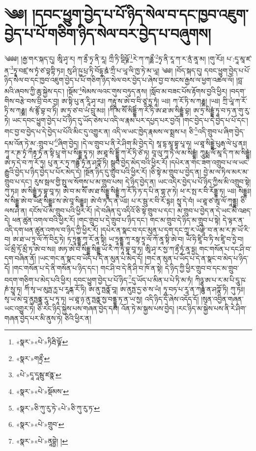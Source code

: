 \chapter{༄༅། །དབང་ཕྱུག་བྱེད་པ་པོ་ཉིད་སེལ་བ་དང་ཁྱབ་འཇུག་བྱེད་པ་པོ་གཅིག་ཉིད་སེལ་བར་བྱེད་པ་བཞུགས། }༄༅༅། །རྒྱ་གར་སྐད་དུ། ཨཱི་ཤྭ་ར། ཀ་རྷྲྀ་ཏྭ་ནི་རཱ། ཀྲྀ་ཏི་བྡིཥྞོ་\footnote{«སྣར་»«པེ་»ཏིརྦི་ཥྞོ་}རེ་ཀ་ཀརྷྲྶྀ་\footnote{«སྣར་»གརྟྲྀ་}ཏྭ་ནི་རཱ་ཀ་ར་ནྲཾ་ནཱ་མ། །གུ་རོཿ། པ་:དཱ་མཱ་ཛ་ན་\footnote{«པེ་»དཱ་དཱམྦུ་ཛནྣ་}ཏྭཱ་བཛྲ་ས་ཏྭཾ་ཙ་བྟཀྟི་ཏཿ། སུ་ཤི་ཥྱ་པྲ་ཏི་བོདྷཱ་རྛཾ་ཀྲྀ་པ་ཡཱ་ལི་ཁྱ་ཏེ་མ་ཡཱ། ༄༅། །བོད་སྐད་དུ། དབང་ཕྱུག་བྱེད་པ་པོ་ཉིད་སེལ་བ་དང་ཁྱབ་འཇུག་བྱེད་པ་པོ་གཅིག་ཉིད་སེལ་བར་བྱེད་པ་ཞེས་བྱ་བ་སངས་རྒྱས་ལ་ཕྱག་འཚལ་ལོ། །བླ་མའི་ཞབས་ཀྱི་ཆུ་སྐྱེས་དང་། །སྡོམ་\footnote{«སྣར་»«པེ་»སྡོམས་}སེམས་ལའང་གུས་བཏུད་ནས། །སློབ་མ་བཟང་པོས་རྟོགས་བྱའི་ཕྱིར། །བདག་གིས་བརྩེ་བས་བྲི་བར་བྱ། ཨ་སྟི་པུ་ན་རཱི་ཤྭ་རཿ། ཀརྟྱཱ་ས་ཨེ་བ་བི་ཙཱ་ཏྱ་ཏཱཾ། ཡཿ། ཀ་རོ་ཏི་ས་ཀརྞྞ། །ཡཿ། ཀྲི་ཡཱཾ་ཀ་རོ་ཏི་ས་ཀརྞྞ། སཾ་ཛྙོ་བྷ་བ་ཏི། ཨ་ཏྲ་ཙ་བ་ཡཾ་བྲུ་མཿ། །ཀི་མ་སཽ་སིདྡྷིཾ་ཀ་རོ་ཏི་ཨ་ཐ་ཨ་སིདྡྷཾ་བྷ། ཨ་ཏྲ་སིདྡྷཾ་ཏཱ་བ་ཏ་ན་གུ་རུ་ཏེ། ཡང་དབང་ཕྱུག་བྱེད་པ་པོ་ཉིད་དུ་ཡོད་ཅེས་པ་འདི་ལ་རྣམ་པར་དཔྱད་པར་བྱའོ། །གང་བྱེད་པ་དེ་བྱེད་པ་པོ་དང་། གང་བྱ་བ་བྱེད་པ་དེ་བྱེད་པ་པོའི་མིང་དུ་འགྱུར་ན། འདི་ལ་ཡང་ཁྱེད་རྣམས་ལ་སྨྲས་པ། ཅི་\footnote{«སྣར་»ཅི་ཀུ་རུ་ཏེ་«པེ་»ཅི་ཀུ་རུ་ཏ་}འདི་གྲུབ་པ་ཞིག་བྱེད་དམ་འོན་ཏེ་མ་:གྲུབ་པ་\footnote{«སྣར་»«པེ་»གྲུབ་}ཞིག་བྱེད། །དེ་ལ་གྲུབ་པ་ནི་རེ་ཤིག་མི་བྱེད་དེ། སཱ་དྷ་མཱ་བྷཱ་པཱ་ཧ། ཡ་ཐཱ་སིདྡྷེ་པུརྒ་ལེ་པུ་ནཿ། ཀཱ་ར་ཎ་ཏྭཾ་ཀྀརྟྭ་ཏྭཾ་ན་སྟི་པྲཱ་གེ་པ་སིདྡྷ་ཏྭཱ་ཏ། ཨ་ཐཱ་སི་དྡྷཱིཾ་ཀ་རོ་ཏི་ཙེ་ཏ། བཱ་ལུ་ཀཱ་ཏཻ་ལ་མ་སིདྡྷཾ། ཀཱུརྨྨ་ལོ་མཱ་དི་ཀ་མ་སིདྡྷཾ། ཨེ་ཏ་དེ་བ་ཀ་རོ་ཏུ། པུ་ན་ར་ཏྲ་ཀརྟྟྲྀ་ཏྭཾ་ན་ཤཀྣོ་ཏི། སྒྲུབ་བྱེད་མེད་བའི་ཕྱིར་རོ། །དཔེར་ན་གང་ཟག་འགྲུབ་པ་ལ་ཡང་རྒྱུའི་བྱེད་པ་ཉིད་བྱེད་པ་པོར་མེད་དེ། །སྔོན་ཉིད་དུ་གྲུབ་པའི་ཕྱིར་རོ། །ཅི་སྟེ་མ་གྲུབ་པ་བྱེད་ན། བྱེ་མ་ལ་ཏིལ་མར་མ་གྲུབ་པ་དང་། རུས་སྦལ་གྱི་སྤུ་ལ་སོགས་པ་མ་གྲུབ་པས། དེ་ཉིད་བྱེད་ན། ཡང་འདིར་བྱེད་པ་པོ་ཉིད་ཀྱིས་མི་འགྲུབ་སྟེ། ཀུ་ཏཿ། ཨ་སིདྡྷཾ་ཏྭ་བྷཱ་བཱ་ཏ། ཨེ་བ་མ་སཽ་ཨ་ཐ་སིདྡྷཱ་སིདྡྷཾ་ཀ་རོ་ཏི་ཏ་ད་པི་ན་གྷ་ཊ་ཏེ། ཕ་ར་སྤ་ར་བི་རོཏྡྷ་ཏ། ཡཿ། སིདྡྷཿ། ས་སིདྡྷ་ཨེ་བ་ཡོརྡ་སིདྡྷཿ་ས་ཨེ་བཱ་སིདྡྷཿ། ཨེ་བཾ་ཏ་ད་ན་ཡོཿ། པ་ར་སྦུ་ར་བི་རོ་དྷཿ། སྱཱ་དེ་བཾ། ཡ་ཐཱ་ཙ་ཨཱ་ལོ་ཀཱནྡྷ། ཅི་ལས་ཤེ་ན། དངོས་པོ་མ་གྲུབ་པའི་ཕྱིར་རོ། །དེ་བཞིན་དུ་འདིའོ་ཅི་སྟེ་གྲུབ་པ་དང་། མ་གྲུབ་པ་བྱེད་ན་དེ་ཡང་མི་འཐད་དེ། ཕན་ཚུན་འགལ་བའི་ཕྱིར་རོ། །གང་གྲུབ་པ་དེ་གྲུབ་པ་ཉིད་དང་། གང་མ་གྲུབ་དེ་ཉིད་མ་གྲུབ་པ་སྟེ། དེ་ལྟར་ན་འདི་དག་ཕན་ཚུན་འགལ་བ་ཉིད་ཀྱི་ཕྱིར་རོ། །དཔེར་ན་སྣང་བ་དང་མུན་པ་དག་དང་ཀྲཱ་ར་ཡོརྫཱི་བ་ན་མ་ར་ཎ་ཡོ་རི་བ། ཨ་ཐ་ཡ་ཏྲཱ་ལོ་ཀོ་བིརྱ་ཏེ། ཏ་ཏྲཱནྡྷ་ཀཱ་རོ་ནཱ་སྟི། ཡ་ཏྲཱནྡྷ་ཀཱ་རསྟ་ཏྲཱ་ལོ་ཀོ་ནཱ་སྟི་ཨེ་བ། ཡོ་ཧི་ཛཱི་བ་ཏི་ས་ཛཱི་བ་ཏྱེ་བ། ཡོ་མྲྀ་ཏོ་མྲྀ་ཏ་ཨེ་བ་སཿ། ཨཏ་ཨེ་བ་སིདྡྷ་སིདྡྷ་ཡོ་རཻ་ཀ་ཏཱ་བྷཱ་བཱ་ཏ། ཨཱི་ཤྭ་ར་སྱ་ཀ་རྟྲྀ་ཏྭཾ་ནཱ་དྡྱ། གང་གསོན་པ་དང་ཤི་བ་དག་བཞིན་ནོ། །ཡང་གང་ན་སྣང་བ་ཡོད་པ་དེ་ན་མུན་པ་མེད་དོ། །གང་ན་མུན་པ་ཡོད་པ་དེ་ན་སྣང་བ་མེད་པ་ཉིད་དོ། །གང་གསོན་པ་དེ་ནི་གསོན་པ་ཉིད་དང་། གང་ཤི་བ་དེ་ནི་ཤི་བ་ཁོ་ན་སྟེ། དེ་ཉིད་ཀྱི་ཕྱིར་གྲུབ་བ་དང་མ་གྲུབ་བདག་གཅིག་པ་མེད་པའི་ཕྱིར། དབང་ཕྱུག་བྱེད་པ་པོ་ཉིད་\footnote{«སྣར་»«པེ་»ནཱབྷྱེ། །}དུ་ཡོད་པ་མིན་པ་པེ་ཏི་མ་ཏཾ། ཀིཉྩ་ཨ་པ་ར་མ་པི་དཱུ་ཥ་ཎཾ་སྱཱ་ཏ། ཀིཾ་སྭ་ཡ་མུཏྤ་ཪྻ་པ་རཱནྐ་རོ་ཏི། ཨ་ནུ་ཏྤནྣོ་བཱ། ཨ་ནུཏྤ་དྱ་ཅ་ས་ཡཾ། ཏཱ་བཏ་པ་རཱ་ན་ཀརྟྟུཾ་ན་ཤཀྣོ་ཏི། ཀུ་ཏཿ། སྭ་ཡ་མེ་བཱ་ནུཏྤནྣཱ་རཱུ་པ་ཏཱ་ཏ། ཡ་ཐཱ་ཉ་ནུ་ཏྤནྣ་སྱ་བནྡྷཱ་ཏ་ན་ཡ་སྱ། འདི་ཉིད་དོ་ཞེས་འདོད་དོ། །སུན་འབྱིན་གཞན་ཡང་འགྱུར་ཏེ། ཅི་རང་ཉིད་སྐྱེས་པས་གཞན་བྱེད་དམ། འོན་ཏེ་མ་སྐྱས་པས་བྱེད། །རང་ཉིད་མ་སྐྱེས་པས་ནི་རེ་ཤིག་གཞན་བྱེད་པར་མི་ནུས་ཏེ། ཅིའི་ཕྱིར་ན། 